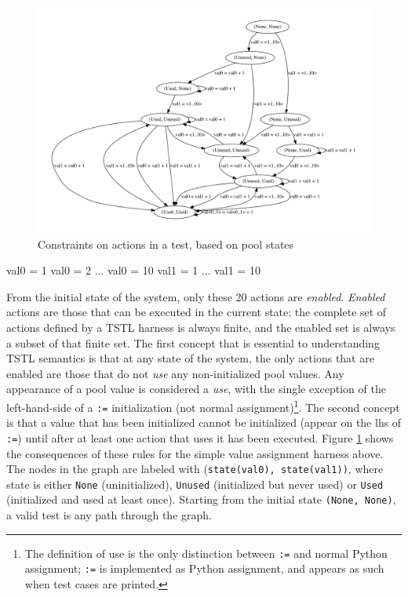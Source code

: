 \begin{figure}
\includegraphics[width=\columnwidth]{states}
\caption{Constraints on actions in a test, based on pool states}
\label{fig:poolacts}
\end{figure}

{\scriptsize
\begin{code}
val0 = 1
val0 = 2 ...
val0 = 10
val1 = 1 ...
val1 = 10
\end{code}
}

From the initial state of the system, only these 20 actions are
\emph{enabled}.  \emph{Enabled} actions are those that can be executed in the
current state; the complete set of actions defined by a TSTL harness is always
finite, and the enabled set is always a subset of that finite set.  The first concept that is essential to understanding
TSTL semantics is that at any state of the
system, the only actions that are enabled are those that do not
\emph{use} any non-initialized pool values.  Any appearance of a pool
value is considered a \emph{use}, with the single exception of the left-hand-side of a
{\tt :=} initialization (not normal assignment)\footnote{The definition of
use is the only distinction between {\tt :=} and normal Python
assignment; {\tt :=} is implemented as Python assignment, and appears
as such when test cases are printed.}.  The second concept is that a
value that has been initialized
cannot be initialized (appear on the lhs of {\tt :=}) until after at
least one action
that uses it has been executed.  Figure \ref{fig:poolacts} shows the
consequences of these rules for the simple value assignment harness
above.  The nodes in the graph are labeled with {(\tt state(val0),
  state(val1))}, where state is
either {\tt None} (uninitialized), {\tt Unused} (initialized
but never used) or {\tt Used} (initialized and used at least once).
Starting from the initial state {\tt (None, None)}, a valid test is any path
through the graph. 

